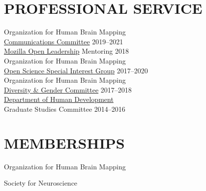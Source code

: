 \documentclass{dupre-cv}
\begin{document}
\section{PROFESSIONAL SERVICE}

Organization for Human Brain Mapping \\ \href{https://www.humanbrainmapping.org/i4a/pages/index.cfm?pageID=3313&activateFull=true}{Communications Committee}  \hfill 2019--2021 \\

\href{https://foundation.mozilla.org/en/opportunity/mozilla-open-leaders/round-6/}{Mozilla Open Leadership} Mentoring \hfill 2018 \\

Organization for Human Brain Mapping \\ \href{https://www.humanbrainmapping.org/i4a/pages/index.cfm?pageID=3712}{Open Science Special Interest Group}  \hfill 2017--2020 \\

Organization for Human Brain Mapping \\ \href{https://www.humanbrainmapping.org/i4a/pages/index.cfm?pageid=3313}{Diversity \& Gender Committee}  \hfill 2017--2018 \\

\href{http://www.human.cornell.edu/hd/}{Department of Human Development} \\ Graduate Studies Committee  \hfill 2014--2016 \\


\section{MEMBERSHIPS}

Organization for Human Brain Mapping
\vspace{5pt}

Society for Neuroscience
\end{document}
